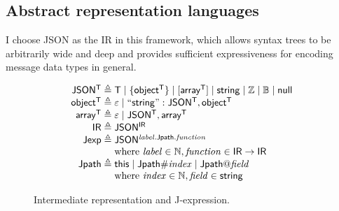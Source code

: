 \subsection{Abstract representation languages}
\label{sec:shrink-ir}
I choose JSON as the IR in this framework, which allows syntax trees to be
arbitrarily wide and deep and provides sufficient expressiveness for encoding
message data types in general.

\begin{figure}
\[\begin{array}{r@{\;}l}
\mathsf{JSON^T}\triangleq&\mathsf T\mid\{\mathsf{object^T}\}\mid[\mathsf{array^T}]\mid\mathsf{string}\mid\Int\mid\Bool\mid\mathsf{null}\\
\mathsf{object^T}\triangleq&\nil\mid\mathsf{``string": JSON^T,object^T}\\
\mathsf{array^T}\triangleq&\nil\mid\mathsf{JSON^T,array^T}\\
\mathsf{IR}\triangleq&\mathsf{JSON^{IR}}\\
\mathsf{Jexp}\triangleq&\mathsf{JSON^{\Jref{\Label}{\Jpath}{\Function}}}\\
&\text{where }\Label\in\Nat,\Function\in\mathsf{IR}\to\mathsf{IR}\\
\Jpath\triangleq&\This\mid\Jpath\Number\Index\mid\Jpath\At\Field\\
&\text{where }\Index\in\Nat,\Field\in\mathsf{string}
\end{array}\]
\caption{Intermediate representation and J-expression.}
\label{fig:ir-jexp}
\end{figure}

